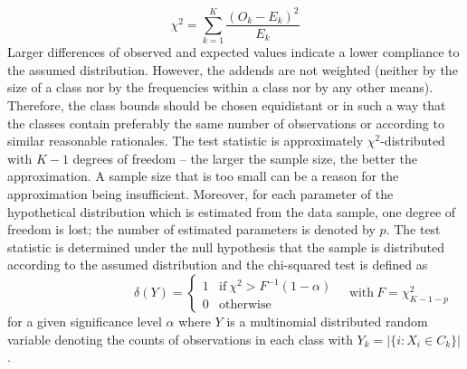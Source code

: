 \documentclass[a4paper, 12pt, titlepage, headsepline, listof = totoc, bibliography = totoc, numbers = noenddot]{scrartcl}
\begin{document}
\[\chi^2 = \sum_{k=1}^{K}\frac{(O_k - E_k)^2}{E_k}\]
Larger differences of observed and expected values indicate a lower compliance to the assumed distribution. However, the addends are not weighted (neither by the size of a class nor by the frequencies within a class nor by any other means). Therefore, the class bounds should be chosen equidistant or in such a way that the classes contain preferably the same number of observations or according to similar reasonable rationales. The test statistic is approximately $\chi^2$-distributed with $K-1$ degrees of freedom -- the larger the sample size, the better the approximation. A sample size that is too small can be a reason for the approximation being insufficient. Moreover, for each parameter of the hypothetical distribution which is estimated from the data sample, one degree of freedom is lost; the number of estimated parameters is denoted by $p$. The test statistic is determined under the null hypothesis that the sample is distributed according to the assumed distribution and the chi-squared test is defined as
\[
  \phantom{\quad\mbox{with}\ F=\chi^2_{K-1-p}}
  \delta(Y) =
   \left\{ 
    \begin{array}{cll}
                 1 & \mbox{if} \ \chi^2 > F^{-1}(1-\alpha)\\
                 0 & \mbox{otherwise}
    \end{array} 
   \right.
   \quad\mbox{with}\ F=\chi^2_{K-1-p}
\]
for a given significance level $\alpha$ where $Y$ is a multinomial distributed random variable denoting the counts of observations in each class with $Y_k = |\{i : X_i \in C_k\}|$.
\end{document}
